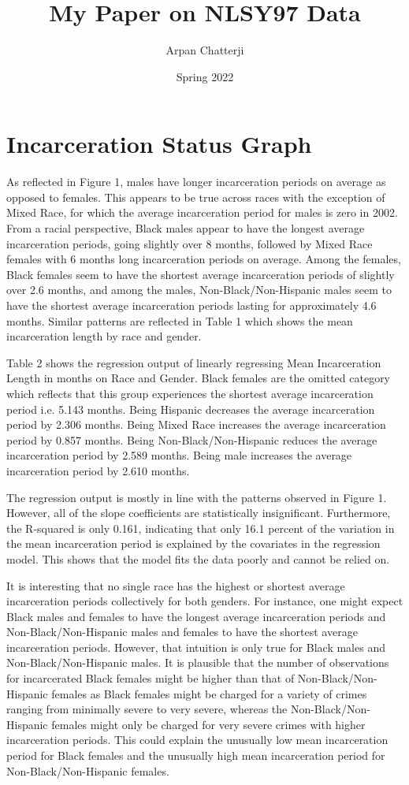 \documentclass{article}
\author{Arpan Chatterji}
\title{My Paper on NLSY97 Data}
\date{Spring 2022}
\begin{document}
\maketitle

\section{Incarceration Status Graph}

As reflected in Figure 1, males have longer incarceration periods on average as opposed to females. This appears to be true across races with the exception of Mixed Race, for which the average incarceration period for males is zero in 2002. From a racial perspective, Black males appear to have the longest average incarceration periods, going slightly over 8 months, followed by Mixed Race females with 6 months long incarceration periods on average. Among the females, Black females seem to have the shortest average incarceration periods of slightly over 2.6 months, and among the males, Non-Black/Non-Hispanic males seem to have the shortest average incarceration periods lasting for approximately 4.6 months. Similar patterns are reflected in Table 1 which shows the mean incarceration length by race and gender.

Table 2 shows the regression output of linearly regressing Mean Incarceration Length in months on Race and Gender. Black females are the omitted category which reflects that this group experiences the shortest average incarceration period i.e. 5.143 months. Being Hispanic decreases the average incarceration period by 2.306 months. Being Mixed Race increases the average incarceration period by 0.857 months. Being Non-Black/Non-Hispanic reduces the average incarceration period by 2.589 months. Being male increases the average incarceration period by 2.610 months.

The regression output is mostly in line with the patterns observed in Figure 1. However, all of the slope coefficients are statistically insignificant. Furthermore, the R-squared is only 0.161, indicating that only 16.1 percent of the variation in the mean incarceration period is explained by the covariates in the regression model. This shows that the model fits the data poorly and cannot be relied on.

It is interesting that no single race has the highest or shortest average incarceration periods collectively for both genders.
For instance, one might expect Black males and females to have the longest average incarceration periods and Non-Black/Non-Hispanic males and females to have the shortest average incarceration periods. However, that intuition is only true for Black males and Non-Black/Non-Hispanic males. It is plausible that the number of observations for incarcerated Black females might be higher than that of Non-Black/Non-Hispanic females as Black females might be charged for a variety of crimes ranging from minimally severe to very severe, whereas the Non-Black/Non-Hispanic females might only be charged for very severe crimes with higher incarceration periods. This could explain the unusually low mean incarceration period for Black females and the unusually high mean incarceration period for Non-Black/Non-Hispanic females.
\end{document}
